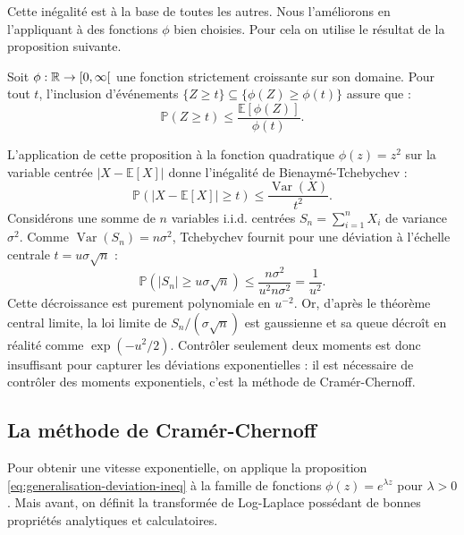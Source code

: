 Cette inégalité est à la base de toutes les autres. Nous l'améliorons en l'appliquant à des fonctions $ \phi$ bien choisies. Pour cela on utilise le résultat de la proposition suivante. 

\begin{proposition} 
    Soit $\phi : \mathbb{R} \to [0, \infty[$ une fonction strictement croissante sur son domaine. Pour tout $t$, l'inclusion d'événements $\{Z \geqslant t\} \subseteq \{\phi(Z) \geqslant \phi(t)\}$ assure que :
    \begin{equation}
        \mathbb{P}(Z \geqslant t) \leqslant \frac{\mathbb{E}[\phi(Z)]}{\phi(t)}.
        \label{eq:generalisation-deviation-ineq}
    \end{equation}
\end{proposition}

\begin{remark}
    L'application de cette proposition à la fonction quadratique $\phi(z) = z^2$ sur la variable centrée $|X - \mathbb{E}[X]|$ donne l'inégalité de Bienaymé-Tchebychev :
    \begin{equation}
        \mathbb{P}(|X - \mathbb{E}[X]| \geqslant t) \leqslant \frac{\operatorname{Var}(X)}{t^2}.
    \end{equation}
    Considérons une somme de $n$ variables i.i.d. centrées $S_n = \sum_{i=1}^n X_i$ de variance $\sigma^2$. Comme $\operatorname{Var}(S_n) = n\sigma^2$, Tchebychev fournit pour une déviation à l'échelle centrale $t = u \sigma \sqrt{n}$ :
    \begin{equation}
        \mathbb{P}(|S_n| \geqslant u \sigma \sqrt{n}) \leqslant \frac{n \sigma^2}{u^2 n \sigma^2} = \frac{1}{u^2}.
    \end{equation}
    Cette décroissance est purement polynomiale en $u^{-2}$. Or, d'après le théorème central limite, la loi limite de $S_n / (\sigma \sqrt{n})$ est gaussienne et sa queue décroît en réalité comme $\exp(-u^2 / 2)$. Contrôler seulement deux moments est donc insuffisant pour capturer les déviations exponentielles : il est nécessaire de contrôler des moments exponentiels, c'est la méthode de Cramér-Chernoff. 
\end{remark}

\subsection{La méthode de Cramér-Chernoff}

Pour obtenir une vitesse exponentielle, on applique la proposition \ref{eq:generalisation-deviation-ineq} à la famille de fonctions $\phi(z) = e^{\lambda z}$ pour $\lambda > 0$. Mais avant, on définit la transformée de Log-Laplace possédant de bonnes propriétés analytiques et calculatoires. 

